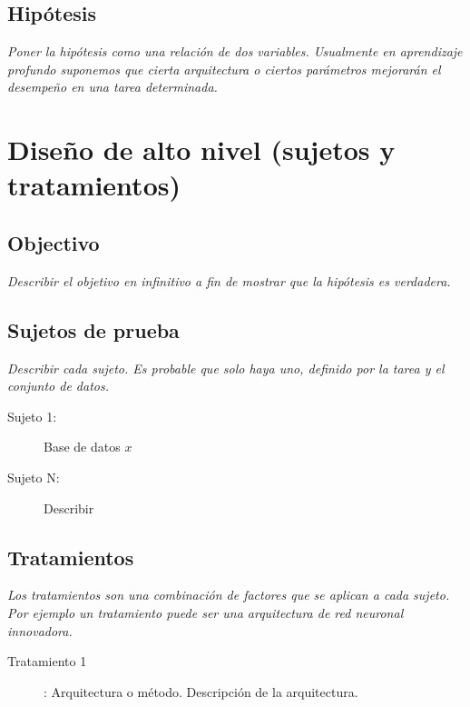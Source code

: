 \documentclass[12pt,twoside,letterpaper]{article}
\begin{document}

\subsection{Hipótesis}

\emph{Poner la hipótesis como una relación de dos variables. Usualmente en aprendizaje profundo suponemos que cierta arquitectura o ciertos parámetros mejorarán el desempeño en una tarea determinada.}

\section{Diseño de alto nivel (sujetos y tratamientos)}

\subsection{Objectivo}
\emph{Describir el objetivo en infinitivo a fin de mostrar que la hipótesis es verdadera.}

\subsection{Sujetos de prueba}

\emph{Describir cada sujeto. Es probable que solo haya uno, definido por la tarea y el conjunto de datos.}

\begin{description}
    \item [Sujeto 1:] Base de datos $x$
    \item [Sujeto N:] Describir
\end{description}

\subsection{Tratamientos}

\emph{Los tratamientos son una combinación de factores que se aplican a cada sujeto. Por ejemplo un tratamiento puede ser una arquitectura de red neuronal innovadora.}

\begin{description}
    \item [Tratamiento 1]: Arquitectura o método. Descripción de la arquitectura.
\end{description}
    
\end{document}
